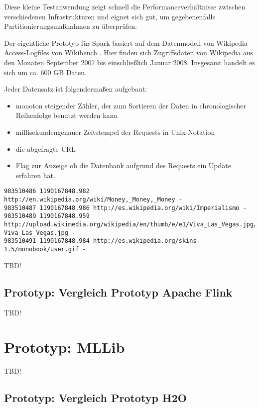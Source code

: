 Diese kleine Testanwendung zeigt schnell die Performanceverhältnisse zwischen verschiedenen Infrastrukturen und eignet sich gut, um gegebenenfalls Partitionierungsmaßnahmen zu überprüfen.  

Der eigentliche Prototyp für Spark basiert auf dem Datenmodell von Wikipedia-Access-Logfiles von Wikibench . Hier finden sich Zugriffsdaten von Wikipedia aus den Monaten September 2007 bis einschließlich Januar 2008. Insgesamt handelt es sich um ca. 600 GB Daten. 

Jeder Datensatz ist folgendermaßen aufgebaut:

\begin{itemize}
\item monoton steigender Zähler, der zum Sortieren der Daten in chronologischer Reihenfolge benutzt werden kann
\item millisekundengenauer Zeitstempel der Requests in Unix-Notation
\item die abgefragte URL
\item Flag zur Anzeige ob die Datenbank aufgrund des Requests ein Update erfahren hat. 
\end{itemize}

\begin{lstlisting}[label=vwikilogs,caption=Beispieleinträge der Wikipedia Access Logs.]
983510486 1190167848.982 http://en.wikipedia.org/wiki/Money,_Money,_Money -
983510487 1190167848.986 http://es.wikipedia.org/wiki/Imperialismo -
983510489 1190167848.959 http://upload.wikimedia.org/wikipedia/en/thumb/e/e1/Viva_Las_Vegas.jpg/180px-Viva_Las_Vegas.jpg -
983510491 1190167848.984 http://es.wikipedia.org/skins-1.5/monobook/user.gif -
\end{lstlisting}

TBD!

\subsection{Prototyp: Vergleich Prototyp Apache Flink }
\label{section:vergleich apache flink}

TBD!

\section{Prototyp: MLLib }
\label{section:prototyp mllib}

TBD!

\subsection{Prototyp: Vergleich Prototyp H2O }
\label{section:vergleich h2o}

